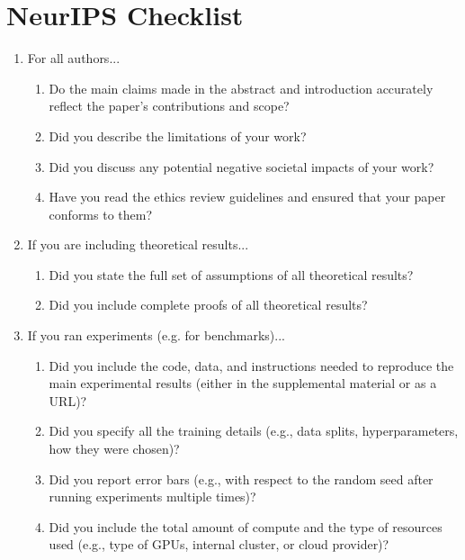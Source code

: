 \documentclass[]{article}
\begin{document}
\section*{NeurIPS Checklist}
\begin{enumerate}
	
	\item For all authors...
	\begin{enumerate}
		\item Do the main claims made in the abstract and introduction accurately reflect the paper's contributions and scope?
		\item Did you describe the limitations of your work?
		\item Did you discuss any potential negative societal impacts of your work?
		\item Have you read the ethics review guidelines and ensured that your paper conforms to them?
		\answerYes{}
	\end{enumerate}
	
	\item If you are including theoretical results...
	\begin{enumerate}
		\item Did you state the full set of assumptions of all theoretical results?
		\item Did you include complete proofs of all theoretical results?
	\end{enumerate}
	
	\item If you ran experiments (e.g. for benchmarks)...
	\begin{enumerate}
		\item Did you include the code, data, and instructions needed to reproduce the main experimental results (either in the supplemental material or as a URL)?
		\item Did you specify all the training details (e.g., data splits, hyperparameters, how they were chosen)?
		\item Did you report error bars (e.g., with respect to the random seed after running experiments multiple times)?
		\item Did you include the total amount of compute and the type of resources used (e.g., type of GPUs, internal cluster, or cloud provider)?
	\end{enumerate}
	

\end{enumerate}
\end{document}
